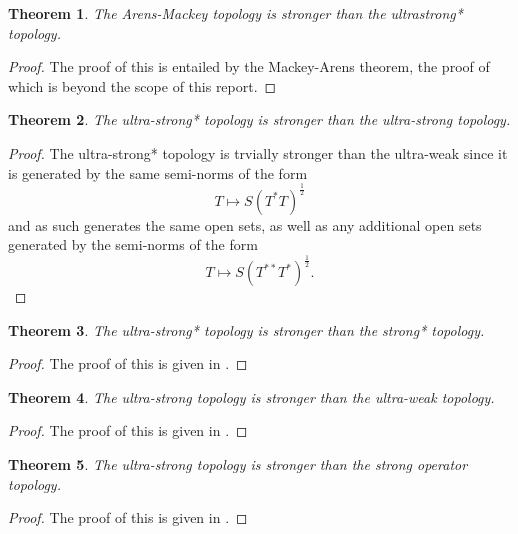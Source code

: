 \documentclass{article}
\theoremstyle{plain}
\newtheorem{theorem}{Theorem}
\theoremstyle{definition}
\begin{document}
                \begin{theorem}
                        The Arens-Mackey topology is stronger than the ultrastrong* topology.
                \end{theorem}
                \begin{proof}
                        The proof of this is entailed by the Mackey-Arens theorem, the proof of which is beyond the scope of this report.
                \end{proof}

                \begin{theorem}
                        The ultra-strong* topology is stronger than the ultra-strong topology.
                \end{theorem}
                \begin{proof}
                        The ultra-strong* topology is trvially stronger than the ultra-weak since it is generated by the same semi-norms of the form
                                $$T \mapsto S(T^*T)^\frac{1}{2}$$
                        and as such generates the same open sets, as well as any additional open sets generated by the semi-norms of the form 
                                $$T \mapsto S(T^{**}T^*)^\frac{1}{2}.$$
                \end{proof}

                \begin{theorem}
                        The ultra-strong* topology is stronger than the strong* topology.
                \end{theorem}
                \begin{proof}
                        The proof of this is given in \cite{cycr}.
                \end{proof}
                
                \begin{theorem}
                        The ultra-strong topology is stronger than the ultra-weak topology.
                \end{theorem}
                \begin{proof}
                        The proof of this is given in \cite{cycr}.
                \end{proof}

                \begin{theorem}
                        The ultra-strong topology is stronger than the strong operator topology.
                \end{theorem}
                \begin{proof}
                        The proof of this is given in \cite{cycr}.
                \end{proof}
\end{document}
